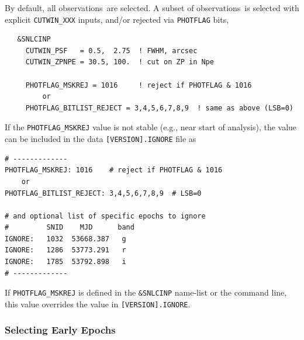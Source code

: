 \documentclass[12pt]{article}
\newcommand{\obss}{observations}
\begin{document}
By default, all \obss\ are selected.
A subset of \obss\ is selected with explicit {\tt CUTWIN\_XXX} inputs,
and/or rejected via {\tt PHOTFLAG} bits,
\begin{verbatim} 
   &SNLCINP
     CUTWIN_PSF   = 0.5,  2.75  ! FWHM, arcsec
     CUTWIN_ZPNPE = 30.5, 100.  ! cut on ZP in Npe

     PHOTFLAG_MSKREJ = 1016     ! reject if PHOTFLAG & 1016
         or
     PHOTFLAG_BITLIST_REJECT = 3,4,5,6,7,8,9  ! same as above (LSB=0)
\end{verbatim}
%
If the {\tt PHOTFLAG\_MSKREJ} value is not stable 
(e.g., near start of analysis), the value can be included
in the data {\tt [VERSION].IGNORE} file as
%
\begin{verbatim}
# -------------
PHOTFLAG_MSKREJ: 1016    # reject if PHOTFLAG & 1016
    or
PHOTFLAG_BITLIST_REJECT: 3,4,5,6,7,8,9  # LSB=0

# and optional list of specific epochs to ignore
#         SNID    MJD      band
IGNORE:   1032  53668.387   g 
IGNORE:   1286  53773.291   r
IGNORE:   1785  53792.898   i
# -------------
\end{verbatim}
%
If {\tt PHOTFLAG\_MSKREJ} is defined in the {\tt \&SNLCINP} name-list
or the command line, this value overrides the value in {\tt [VERSION].IGNORE}.

  \subsubsection{Selecting Early Epochs}
  \label{sss:early}
\end{document}
